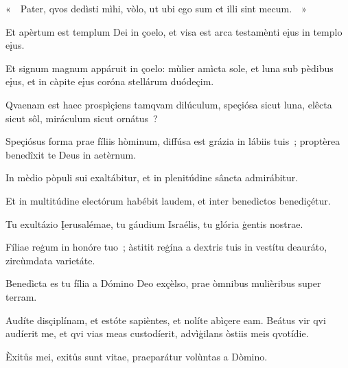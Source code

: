 «~~Pater, qvos dedìsti mìhi, vòlo, ut ubi ego sum et illi sint mecum.~~» 

Et apèrtum est templum Dei in çoelo, et visa est arca testamènti eįus in templo eįus. 


Et signum magnum appáruit in çoelo: mùlier amìcta sole, et luna sub pèdibus eįus, et in càpite eįus coróna stellárum duódeçim. 

Qvaenam est haec prospìçiens tamqvam dilúculum, speçiósa sicut luna, elêcta sicut sôl, miráculum sicut ornátus~? 

Speçiósus forma prae fíliis hòminum, diffúsa est grázia in lábiis tuis~; proptèrea benedîxit te Deus in aetèrnum. 

In mèdio pòpuli sui exaltábitur, et in plenitúdine sâncta admirábitur. 

Et in multitúdine electórum habébit laudem, et inter benedìctos benediçétur. 

Tu exultázio Įerusalémae, tu gáudium Israélis, tu glória ģentis nostrae. 

Fíliae reģum in honóre tuo~; àstitit reģína a dextris tuis in vestítu deauráto, zircùmdata varietáte. 

Benedìcta es tu fília a Dómino Deo exçèlso, prae òmnibus mulièribus super terram. 

Audíte disçiplínam, et estóte sapièntes, et nolíte abìçere eam. Beátus vir qvi audíerit me, et qvi vias meas custodíerit, advìģilans òstiis meis qvotídie. 

Èxitůs mei, exitůs sunt vitae, praeparátur volùntas a Dòmino. 

